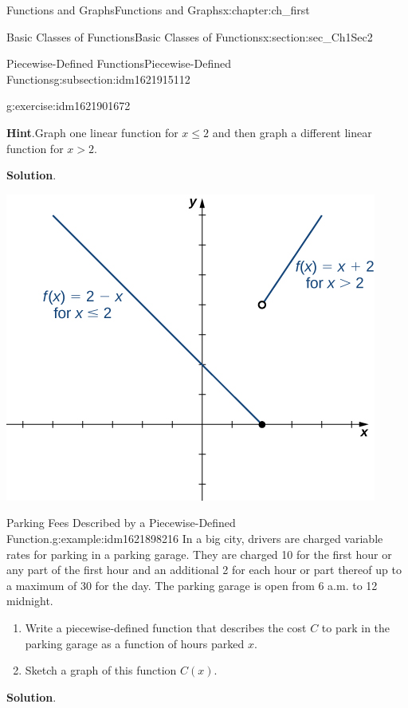 \documentclass[oneside,10pt,]{book}
\newcommand{\blocktitlefont}{\relax}
\numberwithin{equation}{section}
\newcommand{\gt}{>}
\begin{document}
\begin{chapterptx}{Functions and Graphs}{}{Functions and Graphs}{}{}{x:chapter:ch_first}
\begin{sectionptx}{Basic Classes of Functions}{}{Basic Classes of Functions}{}{}{x:section:sec_Ch1Sec2}
\begin{subsectionptx}{Piecewise-Defined Functions}{}{Piecewise-Defined Functions}{}{}{g:subsection:idm1621915112}
\begin{inlineexercise}{}{g:exercise:idm1621901672}
\par\smallskip%
\noindent\textbf{\blocktitlefont Hint}.\hypertarget{g:hint:idm1621900136}{}\quad{}Graph one linear function for \(x\leq   2 \) and then graph a different linear function for \(x\gt  2 .\)%
\par\smallskip%
\noindent\textbf{\blocktitlefont Solution}.\hypertarget{g:solution:idm1621898728}{}\quad{}\begin{image}{0.25}{0.5}{0.25}%
\includegraphics[width=\linewidth]{external/CNX_Calc_Figure_01_02_012.jpg}
\end{image}%
%
\end{inlineexercise}%
\begin{example}{Parking Fees Described by a Piecewise-Defined Function.}{g:example:idm1621898216}%
In a big city, drivers are charged variable rates for parking in a parking garage. They are charged \textdollar{}10 for the first hour or any part of the first hour and an additional \textdollar{}2 for each hour or part thereof up to a maximum of \textdollar{}30 for the day. The parking garage is open from 6 a.m. to 12 midnight.%
%
\begin{enumerate}
\item{}Write a piecewise-defined function that describes the cost \(C\) to park in the parking garage as a function of hours parked \(x.\)%
\item{}Sketch a graph of this function \(C(x).\)%
\end{enumerate}
\par\smallskip%
\noindent\textbf{\blocktitlefont Solution}.\hypertarget{g:solution:idm1621891816}{}\quad{}%

\end{example}
\end{subsectionptx}
\end{sectionptx}
\end{chapterptx}
\end{document}
